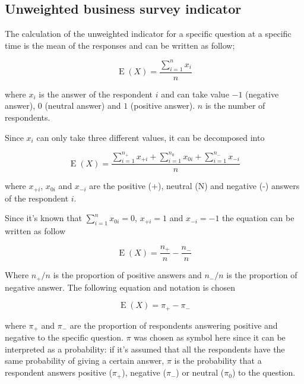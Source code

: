 \documentclass[12pt,a4paper,oneside]{book}
\DeclareMathOperator{\E}{E}
\begin{document}
\subsection{Unweighted business survey indicator}

The calculation of the unweighted indicator for a specific question at a specific time is the mean of the responses and can be written as follow;

\begin{equation}
    \E(X) = \frac{ \sum_{i=1}^n x_i}{n}
\end{equation} 

where 
$x_i$ is the answer of the respondent $i$ and can take value $-1$ (negative answer), $0$ (neutral answer) and $1$ (positive answer). 
$n$ is the number of respondents.

Since $x_i$ can only take three different values, it can be decomposed into

\begin{equation}
    \E(X) = \frac{ \sum_{i=1}^{n_+} x_{+i} + \sum_{i=1}^{n_0} x_{0i} + \sum_{i=1}^{n_-} x_{-i}}{n}
\end{equation} 


where 
$x_{+i}$, $x_{0i}$ and $x_{-i}$ are the positive (+), neutral (N) and negative (-) answers of the respondent $i$.

Since it's known that $\sum_{i=1}^n x_{0i} = 0$, $x_{+i} = 1$ and $x_{-i} = -1$ the equation can be written as follow

\begin{equation}
    \E(X) = \frac{n_+}{n}  - \frac{n_-}{n}
\end{equation} 

Where ${n_+}/{n}$ is the proportion of positive answers and ${n_-}/{n}$ is the proportion of negative answer. The following equation and notation is chosen

\begin{equation}
    \E(X) = \pi_+ - \pi_-  \label{eq: BSI Unweighted}
\end{equation}

where $\pi_+$ and $\pi_-$ are the proportion of respondents answering positive and negative to the specific question.
$\pi$ was chosen as symbol here since it can be interpreted as a probability: if it's assumed that all the respondents have the same probability of giving a certain answer, $\pi$ is the probability that a respondent answers positive ($\pi_+$), negative ($\pi_-$) or neutral ($\pi_0$) to the question. 
\end{document}
